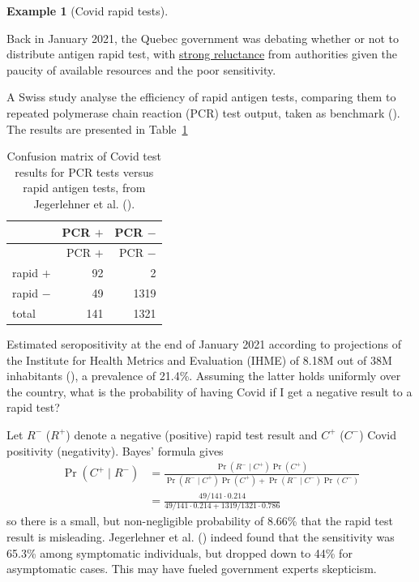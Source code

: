 \documentclass[
  11pt,
  letterpaper,
]{scrbook}
\theoremstyle{definition}
\newtheorem{example}{Example}[chapter]
\theoremstyle{plain}
\theoremstyle{plain}
\theoremstyle{plain}
\theoremstyle{definition}
\theoremstyle{definition}
\theoremstyle{plain}
\theoremstyle{plain}
\theoremstyle{remark}
\begin{document}
\begin{example}[Covid rapid
tests]\protect\hypertarget{exm-covidrapidtest}{}\label{exm-covidrapidtest}

Back in January 2021, the Quebec government was debating whether or not
to distribute antigen rapid test, with
\href{https://www.cbc.ca/news/canada/montreal/quebec-avoids-relying-on-rapid-covid-19-tests-as-pressure-mounts-to-follow-ontario-s-lead-1.5896738}{strong
reluctance} from authorities given the paucity of available resources
and the poor sensitivity.

A Swiss study analyse the efficiency of rapid antigen tests, comparing
them to repeated polymerase chain reaction (PCR) test output, taken as
benchmark ().
The results are presented in Table~\ref{tbl-covid19}

\begin{longtable}[]{@{}lrr@{}}
\caption{Confusion matrix of Covid test results for PCR tests versus
rapid antigen tests, from Jegerlehner et al.
().}\label{tbl-covid19}\tabularnewline
\toprule\noalign{}
& PCR \(+\) & PCR \(-\) \\
\midrule\noalign{}
\endfirsthead
\toprule\noalign{}
& PCR \(+\) & PCR \(-\) \\
\midrule\noalign{}
\endhead
\bottomrule\noalign{}
\endlastfoot
rapid \(+\) & 92 & 2 \\
rapid \(-\) & 49 & 1319 \\
total & 141 & 1321 \\
\end{longtable}

Estimated seropositivity at the end of January 2021 according to
projections of the Institute for Health Metrics and Evaluation (IHME) of
8.18M out of 38M inhabitants (), a prevalence of 21.4\%. Assuming the latter holds uniformly
over the country, what is the probability of having Covid if I get a
negative result to a rapid test?

Let \(R^{-}\) (\(R^{+}\)) denote a negative (positive) rapid test result
and \(C^{+}\) (\(C^{-}\)) Covid positivity (negativity). Bayes' formula
gives \begin{align*}
\Pr(C^{+} \mid R^{-}) & = \frac{\Pr(R^{-} \mid C^{+})\Pr(C^{+})}{\Pr(R^{-} \mid C^{+})\Pr(C^{+}) + \Pr(R^{-} \mid C^{-})\Pr(C^{-})} \\&=
\frac{49/141 \cdot 0.214}{49/141 \cdot 0.214 + 1319/1321 \cdot 0.786}
\end{align*} so there is a small, but non-negligible probability of
8.66\% that the rapid test result is misleading. Jegerlehner et al.
() indeed found that the
sensitivity was 65.3\% among symptomatic individuals, but dropped down
to 44\% for asymptomatic cases. This may have fueled government experts
skepticism.

\end{example}
\end{document}
